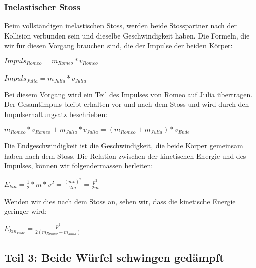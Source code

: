 \documentclass[../main.tex]{subfiles}
\begin{document}
\subsubsection{Inelastischer Stoss}
Beim vollständigen inelastischen Stoss, werden beide Stosspartner nach der Kollision verbunden sein und dieselbe
Geschwindigkeit haben\cite{tiplerpaula.PhysikFurStudierende}. Die Formeln, die wir für diesen Vorgang brauchen sind,
die der Impulse der beiden Körper:
\begin{mdframed}
$Impuls_{Romeo} = m_{Romeo}*v_{Romeo}$\\\\
$Impuls_{Julia} = m_{Julia}*v_{Julia}$
\end{mdframed}
 Bei diesem Vorgang wird ein Teil des Impulses von Romeo auf Julia übertragen. Der Gesamtimpuls bleibt erhalten vor
 und nach dem Stoss und wird durch den Impulserhaltungsatz beschrieben\cite{tiplerpaula.PhysikFurStudierende}:
\begin{mdframed}
$ m_{Romeo}*v_{Romeo} +  m_{Julia}*v_{Julia} = (m_{Romeo} + m_{Julia})*v_{Ende}$
\end{mdframed}
Die Endgeschwindigkeit ist die Geschwindigkeit, die beide Körper gemeinsam haben nach dem Stoss.\newline
Die Relation zwischen der kinetischen Energie und des Impulses, können wir folgendermassen
herleiten\cite{tiplerpaula.PhysikFurStudierende}:
\begin{mdframed}
$E_{kin}=\frac{1}{2} * m * v^{2} = \frac{(mv)^{2}}{2m} = \frac{p^{2}}{2m}$
\end{mdframed}
Wenden wir dies nach dem Stoss an, sehen wir, dass die kinetische Energie geringer wird:
\begin{mdframed}
$E_{kin_{Ende}}=\frac{p^{2}}{2(m_{Romeo} + m_{Julia})} $
\end{mdframed}

\subsection{Teil 3: Beide Würfel schwingen gedämpft}
\end{document}
